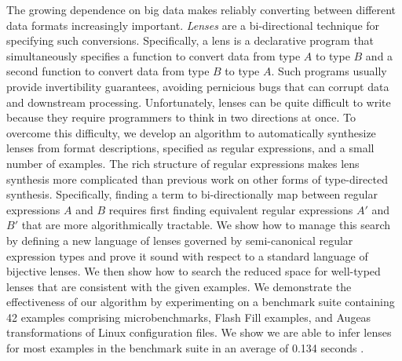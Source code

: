 The growing dependence on big data makes reliably converting
between different data formats increasingly important.
\emph{Lenses} are a bi-directional technique for specifying such
conversions.  Specifically, a lens is a declarative program that
simultaneously specifies a function to convert data from type $A$ to
type $B$ and a second function to convert data from type $B$ to type
$A$.  Such programs usually provide invertibility guarantees, avoiding
pernicious bugs that can corrupt data and downstream processing.
Unfortunately, lenses can be quite difficult to write because they
require programmers to think in two directions at once.  To overcome
this difficulty, we develop an algorithm to automatically synthesize
lenses from format descriptions, specified as regular expressions, and
a small number of examples.  The rich structure of regular expressions
makes lens synthesis more complicated than previous work on other
forms of type-directed synthesis.  Specifically, finding a term to
bi-directionally map between regular expressions $A$ and $B$ requires
first finding equivalent regular expressions $A'$ and $B'$ that are
more algorithmically tractable.
We show how to manage this search by defining a new language of
lenses governed by semi-canonical regular expression types and prove it
sound with respect to a standard language of bijective lenses.  
We then show
how to search the reduced space for well-typed lenses that are consistent
with the given examples.  We demonstrate the effectiveness of our algorithm
by experimenting on a benchmark suite containing 42 examples
comprising microbenchmarks, Flash Fill
examples, and Augeas transformations of Linux configuration files.
We show we are able to infer lenses for most\bcp{!} examples in the
benchmark suite in an average of 0.134 seconds . 






